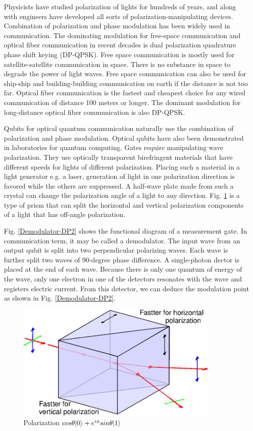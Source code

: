 \documentclass[oneside, letter, 12pt]{book}
\begin{document}
Physicists have studied polarization of lights for hundreds of years, and along with engineers have developed all sorts of polarization-manipulating devices. Combination of polarization and phase modulation has been widely used in communication. The dominating modulation for free-space communication and optical fiber communication in recent decades is dual polarization quadrature phase shift keying (DP-QPSK). Free space communication is mostly used for satellite-satellite communication in space. There is no substance in space to degrade the power of light waves. Free space communication can also be used for ship-ship and building-building communication on earth if the distance is not too far. Optical fiber communication is the fastest and cheapest choice for any wired communication of distance 100 meters or longer. The dominant modulation for long-distance optical fiber communication is also DP-QPSK.

Qubits for optical quantum communication naturally use the combination of polarization and phase modulation. Optical qubits have also been demonstrated in laboratories for quantum computing. Gates require manipulating wave polarization. They use optically transparent birefringent materials that have different speeds for lights of different polarization. Placing such a material in a light generator e.g. a laser, generation of light in one polarization direction is favored while the others are suppressed. A half-wave plate made from such a crystal can change the polarization angle of a light to any direction. Fig. \ref{Polarization-splitter} is a type of prism that can split the horizontal and vertical polarization components of a light that has off-angle polarization.

Fig. \ref{Demodulator-DP2} shows the functional diagram of a measurement gate. In communication term, it may be called a demodulator. The input wave from an output qubit is split into two perpendicular polarizing waves. Each wave is further split two waves of 90-degree phase difference. A single-photon dector is placed at the end of each wave. Because there is only one quantum of energy of the wave, only one electron in one of the detectors resonates with the wave and registers electric current. From this detector, we can deduce the modulation point as shown in Fig. \ref{Demodulator-DP2}.

\begin{figure}[ht]
\includegraphics[width=10cm]{pic/polarization-prism.eps}
\caption{Polarization $cos{\theta} \vert {0} \rangle_{} + e^{i \phi} sin{\theta} \vert {1} \rangle_{}$}
\label{Polarization-splitter}
\end{figure}
\end{document}
